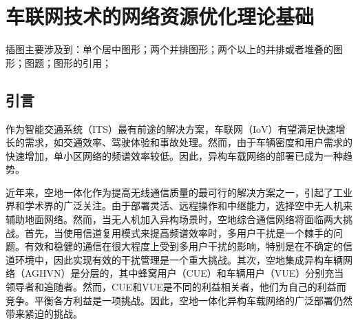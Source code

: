 \chapter{车联网技术的网络资源优化理论基础}
\label{chap:figures}

插图主要涉及到：单个居中图形；两个并排图形；两个以上的并排或者堆叠的图形；图题；图形的引用；

\section{引言}\label{section2-1}
作为智能交通系统（ITS）最有前途的解决方案，车联网（IoV）有望满足快速增长的需求，如交通效率、驾驶体验和事故处理。然而，由于车辆密度和用户需求的快速增加，单小区网络的频谱效率较低\cite{TFL}。因此，异构车载网络的部署已成为一种趋势。

近年来，空地一体化作为提高无线通信质量的最可行的解决方案之一，引起了工业界和学术界的广泛关注。由于部署灵活、远程操作和中继能力，选择空中无人机来辅助地面网络\cite{ACO}。然而，当无人机加入异构场景时，空地综合通信网络将面临两大挑战。首先，当使用信道复用模式来提高频谱效率时，多用户干扰是一个棘手的问题。有效和稳健的通信在很大程度上受到多用户干扰的影响，特别是在不确定的信道环境中，因此实现有效的干扰管理是一个重大挑战\cite{ASO}。其次，空地集成异构车辆网络（AGHVN）是分层的，其中蜂窝用户（CUE）和车辆用户（VUE）分别充当领导者和追随者。然而，CUE和VUE是不同的利益相关者，他们为自己的利益而竞争。平衡各方利益是一项挑战。因此，空地一体化异构车载网络的广泛部署仍然带来紧迫的挑战。


